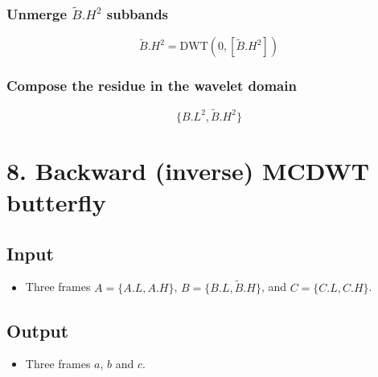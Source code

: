 {\subsubsection{Unmerge $\tilde{B}.H^2$ subbands}
\begin{equation}
  \tilde{B}.H^2 = \text{DWT}(0, [\tilde{B}.H^2])
\end{equation}

\hypertarget{compose-the-residue-in-the-wavelet-domain}{%
\subsubsection{Compose the residue in the wavelet
domain}\label{compose-the-residue-in-the-wavelet-domain}}

\begin{equation}
   \{B.L^2, \tilde{B}.H^2\}
\end{equation}

\section{8. Backward (inverse) MCDWT butterfly}
\subsection{Input}
\begin{itemize}
\tightlist
\item
  Three frames $A=\{A.L, A.H\}$, $B=\{B.L, \tilde{B}.H\}$, and
  $C=\{C.L, C.H\}$.
\end{itemize}

\subsection{Output}
\begin{itemize}
\tightlist
\item
  Three frames $a$, $b$ and $c$.
\end{itemize}

}
